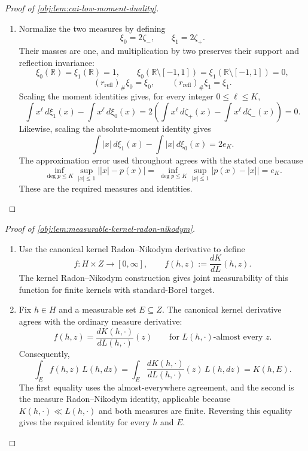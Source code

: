\documentclass[11pt]{article}
\begin{document}
\begin{proof}[Proof of \cref{obj:lem:cai-low-moment-duality}]
\begin{enumerate}
\item Normalize the two measures by defining
\[
\xi_0=2\zeta_-,\qquad \xi_1=2\zeta_+.
\]
Their masses are one, and multiplication by two preserves their support and reflection invariance:
\[
\xi_0(\mathbb R)=\xi_1(\mathbb R)=1,\qquad
\xi_0(\mathbb R\setminus[-1,1])
=\xi_1(\mathbb R\setminus[-1,1])=0,
\]
\[
(r_{\mathrm{refl}})_\#\xi_0=\xi_0,\qquad
(r_{\mathrm{refl}})_\#\xi_1=\xi_1.
\]
Scaling the moment identities gives, for every integer \(0\le\ell\le K\),
\[
\int x^\ell\,d\xi_1(x)-\int x^\ell\,d\xi_0(x)
=2\left(\int x^\ell\,d\zeta_+(x)-\int x^\ell\,d\zeta_-(x)\right)
=0.
\]
Likewise, scaling the absolute-moment identity gives
\[
\int |x|\,d\xi_1(x)-\int |x|\,d\xi_0(x)=2e_K.
\]
The approximation error used throughout agrees with the stated one because
\[
\inf_{\deg p\le K}\sup_{|x|\le1}\bigl||x|-p(x)\bigr|
=
\inf_{\deg p\le K}\sup_{|x|\le1}\bigl|p(x)-|x|\bigr|
=e_K.
\]
These are the required measures and identities.
\end{enumerate}
\end{proof}

\begin{proof}[Proof of \cref{obj:lem:measurable-kernel-radon-nikodym}]
\begin{enumerate}
\item Use the canonical kernel Radon--Nikodym derivative to define
\[
f:H\times Z\longrightarrow[0,\infty],
\qquad
f(h,z):=\frac{dK}{dL}(h,z).
\]
The kernel Radon--Nikodym construction gives joint measurability of this function for finite kernels with standard-Borel target. %

\item Fix \(h\in H\) and a measurable set \(E\subseteq Z\). The canonical kernel derivative agrees with the ordinary measure derivative:
\[
f(h,z)
=
\frac{dK(h,\cdot)}{dL(h,\cdot)}(z)
\qquad\text{for \(L(h,\cdot)\)-almost every \(z\)}.
\]
Consequently,
\[
\int_E f(h,z)\,L(h,dz)
=
\int_E
\frac{dK(h,\cdot)}{dL(h,\cdot)}(z)\,L(h,dz)
=
K(h,E).
\]
The first equality uses the almost-everywhere agreement, and the second is the measure Radon--Nikodym identity, applicable because \(K(h,\cdot)\ll L(h,\cdot)\) and both measures are finite. Reversing this equality gives the required identity for every \(h\) and \(E\). %
\end{enumerate}
\end{proof}




\end{document}
